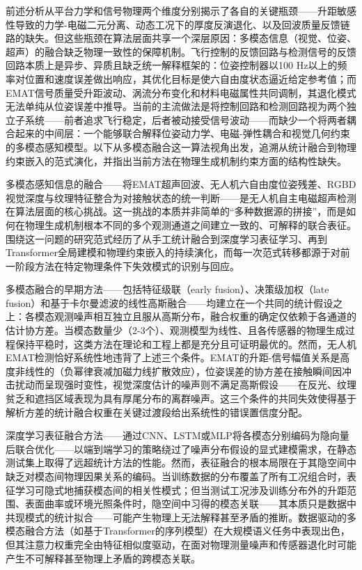前述分析从平台力学和信号物理两个维度分别揭示了各自的关键瓶颈——升距敏感性导致的力学-电磁二元分离、动态工况下的厚度反演退化、以及回波质量反馈链路的缺失。但这些瓶颈在算法层面共享一个深层原因：多模态信息（视觉、位姿、超声）的融合缺乏物理一致性的保障机制。飞行控制的反馈回路与检测信号的反馈回路本质上是异步、异质且缺乏统一解释框架的：位姿控制器以100 Hz以上的频率对位置和速度误差做出响应，其优化目标是使六自由度状态逼近给定参考值；而EMAT信号质量受升距波动、涡流分布变化和材料电磁属性共同调制，其退化模式无法单纯从位姿误差中推导。当前的主流做法是将控制回路和检测回路视为两个独立子系统——前者追求飞行稳定，后者被动接受信号波动——而缺少一个将两者耦合起来的中间层：一个能够联合解释位姿动力学、电磁-弹性耦合和视觉几何约束的多模态感知模型。以下从多模态融合这一算法视角出发，追溯从统计融合到物理约束嵌入的范式演化，并指出当前方法在物理生成机制约束方面的结构性缺失。

多模态感知信息的融合——将EMAT超声回波、无人机六自由度位姿残差、RGBD视觉深度与纹理特征整合为对接触状态的统一判断——是无人机自主电磁超声检测在算法层面的核心挑战。这一挑战的本质并非简单的“多种数据源的拼接”，而是如何在物理生成机制根本不同的多个观测通道之间建立一致的、可解释的联合表征。围绕这一问题的研究范式经历了从手工统计融合到深度学习表征学习、再到Transformer全局建模和物理约束嵌入的持续演化，而每一次范式转移都源于对前一阶段方法在特定物理条件下失效模式的识别与回应。

多模态融合的早期方法——包括特征级联（early fusion）、决策级加权（late fusion）和基于卡尔曼滤波的线性高斯融合——均建立在一个共同的统计假设之上：各模态观测噪声相互独立且服从高斯分布，融合权重的确定仅依赖于各通道的估计协方差。当模态数量少（2-3个）、观测模型为线性、且各传感器的物理生成过程保持平稳时，这类方法在理论和工程上都是充分且可证明最优的。然而，无人机EMAT检测恰好系统性地违背了上述三个条件。EMAT的升距-信号幅值关系是高度非线性的（负幂律衰减加磁力线扩散效应），位姿误差的协方差在接触瞬间因冲击扰动而呈现强时变性，视觉深度估计的噪声则不满足高斯假设——在反光、纹理贫乏和遮挡区域表现为具有厚尾分布的离群噪声。这三个条件的共同失效使得基于解析方差的统计融合权重在关键过渡段给出系统性的错误置信度分配。

深度学习表征融合方法——通过CNN、LSTM或MLP将各模态分别编码为隐向量后联合优化——以端到端学习的策略绕过了噪声分布假设的显式建模需求，在静态测试集上取得了远超统计方法的性能。然而，表征融合的根本局限在于其隐空间中缺乏对模态间物理因果关系的编码。当训练数据的分布覆盖了所有工况组合时，表征学习可隐式地捕获模态间的相关性模式；但当测试工况涉及训练分布外的升距范围、表面曲率或环境光照条件时，隐空间中习得的模态关联——其本质只是数据中共现模式的统计拟合——可能产生物理上无法解释甚至矛盾的推断。数据驱动的多模态融合方法（如基于Transformer的序列模型）在大规模语义任务中表现出色，但其注意力权重完全由特征相似度驱动，在面对物理测量噪声和传感器退化时可能产生不可解释甚至物理上矛盾的跨模态关联。


